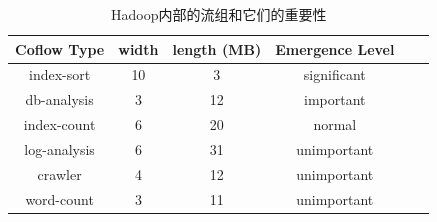  
 \begin{table}[!htb]
\centering
\footnotesize
 \caption{Hadoop内部的流组和它们的重要性} \label{Yosemite:measure2}
\begin{tabular}{|c|c|c|c|c|c|} \hline
\toprule
Coflow Type  &  width&length (MB)&Emergence Level\\
\midrule
index-sort    &10&3  &significant \\
db-analysis   &3&12     &  important \\
index-count   &6&20 &  normal\\
log-analysis   &6&31   &  unimportant \\
crawler  &4&12     &  unimportant \\
word-count  &3&11     &  unimportant\\
\bottomrule
 \end{tabular}
 \end{table}
 
